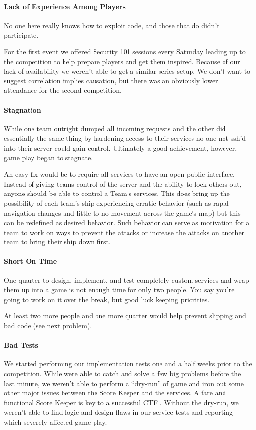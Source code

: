 \documentclass[10pt]{article}
\begin{document}
\paragraph*{Lack of Experience Among Players} No one here really knows how to
exploit code, and those that do didn't participate.

For the first event we offered Security 101 sessions every Saturday leading up
to the competition to help prepare players and get them inspired. Because of
our lack of availability we weren't able to get a similar series setup. We
don't want to suggest correlation implies causation, but there was an obviously
lower attendance for the second competition.

\paragraph*{Stagnation} While one team outright dumped all incoming requests and
the other did essentially the same thing by hardening access to their services
no one not ssh'd into their server could gain control. Ultimately a good
achievement, however, game play began to stagnate.

An easy fix would be to require all services to have an open public interface.
Instead of giving teams control of the server and the ability to lock others
out, anyone should be able to control a Team's services. This does bring up the
possibility of each team's ship experiencing erratic behavior (such as rapid
navigation changes and little to no movement across the game's map) but this
can be redefined as desired behavior. Such behavior can serve as motivation for
a team to work on ways to prevent the attacks or increase the attacks on
another team to bring their ship down first.

\paragraph*{Short On Time} One quarter to design, implement, and test completely
custom services and wrap them up into a game is not enough time for only two
people. You say you're going to work on it over the break, but good luck keeping
priorities.

At least two more people and one more quarter would help prevent slipping and
bad code (see next problem).

\paragraph*{Bad Tests} We started performing our implementation tests one and a
half weeks prior to the competition. While were able to catch and solve a few
big problems before the last minute, we weren't able to perform a ``dry-run'' of
game and iron out some other major issues between the Score Keeper and the
services. A fare and functional Score Keeper is key to a successful CTF
\cite{BlackHat2004}. Without the dry-run, we weren't able to find logic and
design flaws in our service tests and reporting which severely affected game
play.
\end{document}
